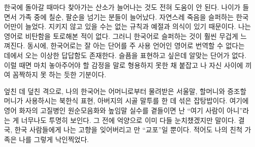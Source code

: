 \documentclass{translation}
\begin{document}
한국에 돌아갈 때마다 찾아가는 산소가 늘어나는 것도 전혀 도움이 안 된다.
나이가 들면서 가족 중에 칠순, 팔순을 넘기는 분들이 늘어났다.
자연스레 죽음을 슬퍼하는 한국어만이 늘었다.
지키지 않고 있을 수는 없는 규칙과 예절과 의식이 있기 때문이다.
나는 영어로 비탄함을 토로해본 적이 없다.
그러니 한국어로 슬퍼하는 것이 훨씬 무겁게 느껴진다.
동시에, 한국어로는 잘 아는 단어를 주 사용 언어인 영어로 번역할 수 없다는 데에서 오는 이상한 답답함도 존재한다.
슬픔을 표현하고 싶은데 알맞는 단어가 없다.
이럴 때면 마치 놓아주어야 할 감정을 말로 형용하지 못한 채 붙잡고 나 자신 사이에 끼여 꼼짝하지 못 하는 듯한 기분이다.
%  

엎친 데 덮친 격으로, 나의 한국어는 어머니로부터 물려받은 서울말, 할머니와 증조할머니가 사용하시는 북한식 표현, 아버지의 시골 말투를 한 데 섞은 잡탕밥이다.
여기에 영어 화자의 고질병인 원순모음화와 높임말 실수를 곁들이면 난 ``여기 사람이 아니''라는 게 너무나도 투명히 보인다.
그 전에 억양으로 이미 다들 눈치챘겠지만 말이다.
결국, 한국 사람들에게 나는 고향을 잊어버리고 만 ``교포''일 뿐이다.
적어도 나의 친척 가족은 나를 그렇게 낙인찍었다.
% 
\end{document}
